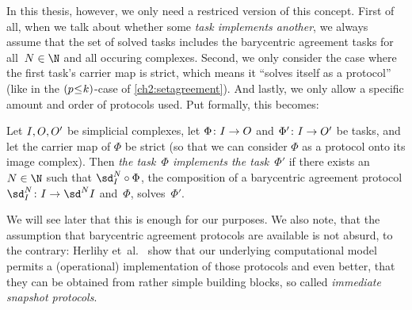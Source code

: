 In this thesis, however, we only need a restriced version of this concept.
First of all, when we talk about whether some \emph{task implements another},
we always assume that the set of solved tasks includes the barycentric agreement
tasks  for all~$N\in\N$ and all occuring
complexes. Second, we only consider the case where the first task's carrier map
is strict, which means it \enquote{solves itself as a protocol} (like in the
$(p\mkern1mu{\leq}\mkern1muk)$-case of \cref{ch2:setagreement}). And lastly, we
only allow a specific amount and order of protocols used. Put formally, this
becomes:

\begin{thDef}
    Let $I,O,O'$ be simplicial complexes, let
    $\Phi\colon I\to O$ and $\Phi'\colon I\to O'$ be tasks, and
    let the carrier map of $\Phi$ be strict (so that we can consider $\Phi$ as a
    protocol onto its image complex). Then \emph{the task~$\Phi$ implements the
    task~$\Phi'$} if there exists an $N\in\N$ such that $\sd_{\cI}^N\after\Phi$,
    the composition of a barycentric agreement protocol
    $\sd_{\cI}^N\colon\cI\to\sd^N\cI$ and~$\Phi$, solves~$\Phi'$.
\end{thDef}

We will see later %
that this is enough for our purposes. We also note, that the assumption
that barycentric agreement protocols are available is not absurd, to the
contrary: Herlihy et~al.~\cite{bookc:herlihyetal13} %
show that our underlying computational model permits a (operational)
implementation of those protocols and even better, that they can be
obtained from rather simple building blocks, so called \emph{immediate
snapshot protocols}.
